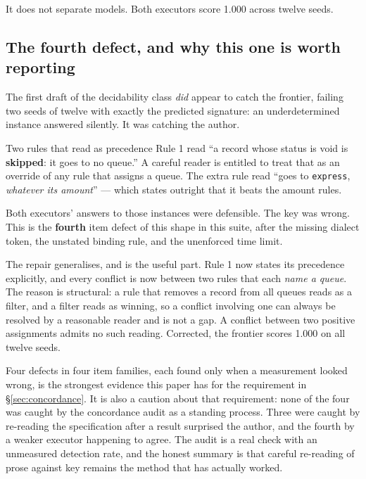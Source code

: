 \documentclass[11pt]{article}
\theoremstyle{definition}
\begin{document}
It does not separate models. Both executors score 1.000 across twelve seeds.

\subsection{The fourth defect, and why this one is worth reporting}\label{sec:fourth}

The first draft of the decidability class \emph{did} appear to catch the frontier, failing two seeds of twelve with exactly the predicted signature: an underdetermined instance answered silently. It was catching the author.

\begin{cautionbox}{Two rules that read as precedence}
Rule 1 read ``a record whose status is void is \textbf{skipped}: it goes to no queue.'' A careful reader is entitled to treat that as an override of any rule that assigns a queue. The extra rule read ``goes to \texttt{express}, \emph{whatever its amount}'' --- which states outright that it beats the amount rules.

Both executors' answers to those instances were defensible. The key was wrong. This is the \textbf{fourth} item defect of this shape in this suite, after the missing dialect token, the unstated binding rule, and the unenforced time limit.
\end{cautionbox}

The repair generalises, and is the useful part. Rule 1 now states its precedence explicitly, and every conflict is now between two rules that each \emph{name a queue}. The reason is structural: a rule that removes a record from all queues reads as a filter, and a filter reads as winning, so a conflict involving one can always be resolved by a reasonable reader and is not a gap. A conflict between two positive assignments admits no such reading. Corrected, the frontier scores 1.000 on all twelve seeds.

Four defects in four item families, each found only when a measurement looked wrong, is the strongest evidence this paper has for the requirement in \S\ref{sec:concordance}. It is also a caution about that requirement: none of the four was caught by the concordance audit as a standing process. Three were caught by re-reading the specification after a result surprised the author, and the fourth by a weaker executor happening to agree. The audit is a real check with an unmeasured detection rate, and the honest summary is that careful re-reading of prose against key remains the method that has actually worked.
\end{document}
